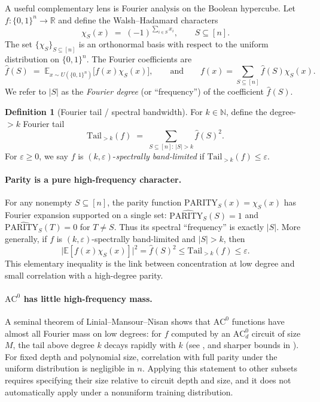 \documentclass[11pt]{article}
\newcommand{\AC}{\mathrm{AC}}
\newcommand{\bits}{\{0,1\}}
\newcommand{\N}{\mathbb{N}}
\theoremstyle{plain}
\theoremstyle{definition}
\newtheorem{definition}[theorem]{Definition}
\theoremstyle{remark}
\numberwithin{equation}{section}
\begin{document}
A useful complementary lens is Fourier analysis on the Boolean hypercube.
Let $f:\bits^{n}\to\mathbb{R}$ and define the Walsh--Hadamard characters
\[
\chi_S(x) \;=\; (-1)^{\sum_{i\in S} x_i}, \qquad S\subseteq[n].
\]
The set $\{\chi_S\}_{S\subseteq[n]}$ is an orthonormal basis with respect to the uniform distribution on $\bits^n$.
The Fourier coefficients are
\[
\hat f(S)\;=\;\mathbb{E}_{x\sim U(\bits^n)}\bigl[f(x)\chi_S(x)\bigr],
\qquad\text{and}\qquad
f(x)=\sum_{S\subseteq[n]}\hat f(S)\chi_S(x).
\]
We refer to $|S|$ as the \emph{Fourier degree} (or ``frequency'') of the coefficient $\hat f(S)$.

\begin{definition}[Fourier tail / spectral bandwidth]
\label{def:fourier-tail}
For $k\in\N$, define the degree-$>k$ Fourier tail
\[
\mathrm{Tail}_{>k}(f)\;=\;\sum_{S\subseteq[n]:\,|S|>k}\hat f(S)^2.
\]
For $\varepsilon\ge0$, we say $f$ is $(k,\varepsilon)$-\emph{spectrally band-limited} if $\mathrm{Tail}_{>k}(f)\le \varepsilon$.
\end{definition}

\paragraph{Parity is a pure high-frequency character.}
For any nonempty $S\subseteq[n]$, the parity function $\mathrm{PARITY}_S(x)=\chi_S(x)$ has Fourier expansion supported on a single set:
$\widehat{\mathrm{PARITY}_S}(S)=1$ and $\widehat{\mathrm{PARITY}_S}(T)=0$ for $T\neq S$.
Thus its spectral ``frequency'' is exactly $|S|$. More generally, if $f$ is $(k,\varepsilon)$-spectrally band-limited and $|S|>k$, then
\begin{equation}
\bigl|\mathbb{E}[f(x)\chi_S(x)]\bigr|^2=\hat f(S)^2\le\mathrm{Tail}_{>k}(f)\le\varepsilon.
\label{eq:tail-correlation}
\end{equation}
This elementary inequality is the link between concentration at low degree and small correlation with a high-degree parity.

\paragraph{$\AC^0$ has little high-frequency mass.}
A seminal theorem of Linial--Mansour--Nisan shows that $\AC^0$ functions have almost all Fourier mass on low degrees:
for $f$ computed by an $\AC^0_d$ circuit of size $M$, the tail above degree $k$ decays rapidly with $k$ (see \cite{linial1993constant}, and sharper bounds in \cite{tal2015tight}).
For fixed depth and polynomial size, correlation with full parity under the uniform distribution is negligible in $n$. Applying this statement to other subsets requires specifying their size relative to circuit depth and size, and it does not automatically apply under a nonuniform training distribution.
\end{document}
